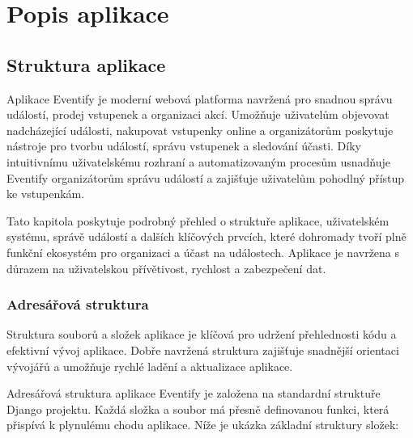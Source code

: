 \documentclass[12pt, a4paper,
twoside,        %
openright
]{report}
\begin{document}
\clearpage

\pagestyle{empty}

\clearpage

\pagestyle{plain}

\chapter{Popis aplikace}

\section{Struktura aplikace}

Aplikace Eventify je moderní webová platforma navržená pro snadnou správu událostí, prodej vstupenek a organizaci akcí. Umožňuje uživatelům objevovat nadcházející události, nakupovat vstupenky online a organizátorům poskytuje nástroje pro tvorbu událostí, správu vstupenek a sledování účasti. Díky intuitivnímu uživatelskému rozhraní a automatizovaným procesům usnadňuje Eventify organizátorům správu událostí a zajišťuje uživatelům pohodlný přístup ke vstupenkám.

Tato kapitola poskytuje podrobný přehled o struktuře aplikace, uživatelském systému, správě událostí a dalších klíčových prvcích, které dohromady tvoří plně funkční ekosystém pro organizaci a účast na událostech. Aplikace je navržena s důrazem na uživatelskou přívětivost, rychlost a zabezpečení dat.

\subsection{Adresářová struktura}

Struktura souborů a složek aplikace je klíčová pro udržení přehlednosti kódu a efektivní vývoj aplikace. Dobře navržená struktura zajišťuje snadnější orientaci vývojářů a umožňuje rychlé ladění a aktualizace aplikace.

Adresářová struktura aplikace Eventify je založena na standardní struktuře Django projektu. Každá složka a soubor má přesně definovanou funkci, která přispívá k plynulému chodu aplikace. Níže je ukázka základní struktury složek:\\
\end{document}
